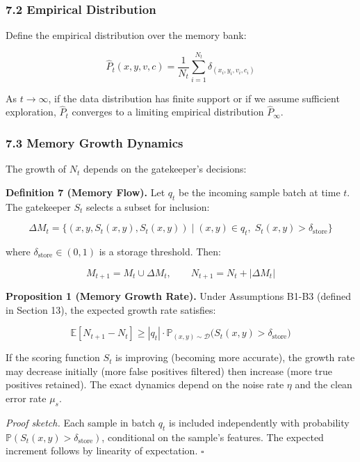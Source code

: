 \documentclass[
  12pt,
]{article}
\begin{document}
\subsubsection{7.2 Empirical Distribution}\label{empirical-distribution}

Define the empirical distribution over the memory bank:

\[\hat{P}_t(x, y, v, c) = \frac{1}{N_t} \sum_{i=1}^{N_t} \delta_{(x_i, y_i, v_i, c_i)}\]

As \(t \to \infty\), if the data distribution has finite support or if
we assume sufficient exploration, \(\hat{P}_t\) converges to a limiting
empirical distribution \(\hat{P}_\infty\).

\subsubsection{7.3 Memory Growth Dynamics}\label{memory-growth-dynamics}

The growth of \(N_t\) depends on the gatekeeper's decisions:

\textbf{Definition 7 (Memory Flow).} Let \(q_t\) be the incoming sample
batch at time \(t\). The gatekeeper \(S_t\) selects a subset for
inclusion:

\[\Delta M_t = \bigl\{ (x, y, S_t(x,y), S_t(x,y)) \mid (x,y) \in q_t, \; S_t(x,y) > \delta_{\text{store}} \bigr\}\]

where \(\delta_{\text{store}} \in (0,1)\) is a storage threshold. Then:

\[M_{t+1} = M_t \cup \Delta M_t, \qquad N_{t+1} = N_t + |\Delta M_t|\]

\textbf{Proposition 1 (Memory Growth Rate).} Under Assumptions B1-B3
(defined in Section 13), the expected growth rate satisfies:

\[\mathbb{E}[N_{t+1} - N_t] \geq |q_t| \cdot \mathbb{P}_{(x,y) \sim \mathcal{D}}\bigl( S_t(x,y) > \delta_{\text{store}} \bigr)\]

If the scoring function \(S_t\) is improving (becoming more accurate),
the growth rate may decrease initially (more false positives filtered)
then increase (more true positives retained). The exact dynamics depend
on the noise rate \(\eta\) and the clean error rate \(\mu_s\).

\emph{Proof sketch.} Each sample in batch \(q_t\) is included
independently with probability
\(\mathbb{P}(S_t(x,y) > \delta_{\text{store}})\), conditional on the
sample's features. The expected increment follows by linearity of
expectation. \(\square\)
\end{document}
